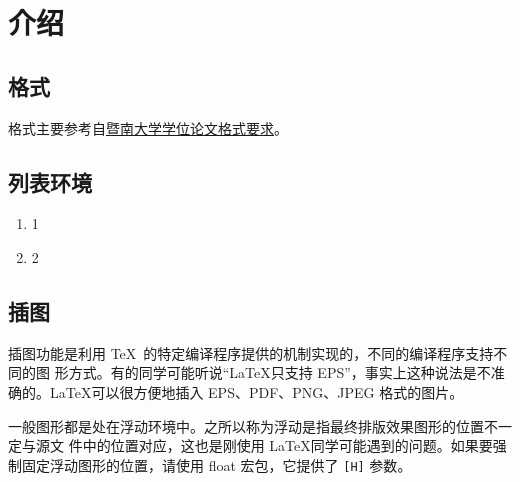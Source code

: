 \chapter{介绍}

\section{格式}

格式主要参考自\textcolor{blue}{\href{https://law.jnu.edu.cn/\_upload/article/files/7f/3f/2212fa15450fbdf616c77b56ed00/107e1dae-6ce2-496d-96bf-fe013defe8c4.pdf}{暨南大学学位论文格式要求}}。



\section{列表环境}
\begin{enumerate}
	\item 1
    \item 2
\end{enumerate}


\section{插图}

插图功能是利用 \TeX\ 的特定编译程序提供的机制实现的，不同的编译程序支持不同的图
形方式。有的同学可能听说“LaTeX只支持 EPS”，事实上这种说法是不准确的。LaTeX可以很方便地插入 EPS、PDF、PNG、JPEG 格式的图片。

一般图形都是处在浮动环境中。之所以称为浮动是指最终排版效果图形的位置不一定与源文
件中的位置对应，这也是刚使用 LaTeX同学可能遇到的问题。如果要强制固定浮动图形的位置，请使用 float 宏包，它提供了 \texttt{[H]} 参数\cite{tex}。